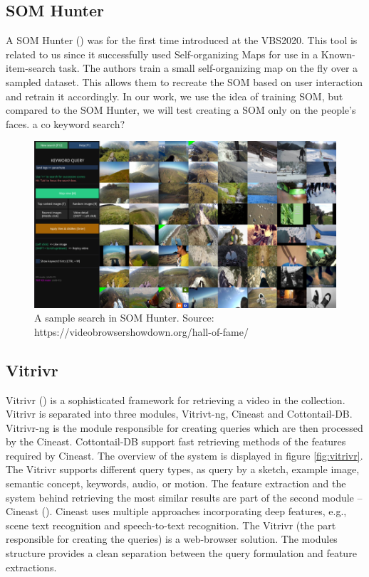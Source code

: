 \subsection{SOM Hunter}

A SOM Hunter (\cite{kratochvil2020som}) was for the first time introduced at the VBS2020. This tool is related to us since it successfully used Self-organizing Maps for use in a Known-item-search task. The authors train a small self-organizing map on the fly over a sampled dataset. This allows them to recreate the SOM based on user interaction and retrain it accordingly. In our work, we use the idea of training SOM, but compared to the SOM Hunter, we will test creating a SOM only on the people's faces. {\color{red} a co keyword search?}

\begin{figure}
    \centering
    \includegraphics[width=0.99\linewidth]{img/som_hunter_small.png}
    \caption{A sample search in SOM Hunter. Source: https://videobrowsershowdown.org/hall-of-fame/}
    \label{fig:som_hunter}
\end{figure}

\subsection{Vitrivr}

Vitrivr (\cite{rossetto2016vitrivr}) is a sophisticated framework for retrieving a video in the collection. Vitrivr is separated into three modules, Vitrivt-ng, Cineast and Cottontail-DB.  Vitrivr-ng is the module responsible for creating queries which are then processed by the Cineast. Cottontail-DB support fast retrieving methods of the features required by Cineast. The overview of the system is displayed in figure \ref{fig:vitrivr}. The Vitrivr supports different query types, as query by a sketch, example image, semantic concept, keywords, audio, or motion. The feature extraction and the system behind retrieving the most similar results are part of the second module -- Cineast (\cite{rossetto2016searching}). Cineast uses multiple approaches incorporating deep features, e.g., scene text recognition and speech-to-text recognition. The Vitrivr (the part responsible for creating the queries) is a web-browser solution. The modules structure provides a clean separation between the query formulation and feature extractions.


